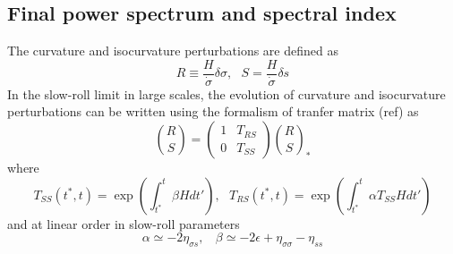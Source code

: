 \documentclass[twocolumn,           %
               showpacs,            %
               preprintnumbers,     %
               aps,                 %
               prl,          	    %
               letterpaper,             %
               superscriptaddress,      %
               nofootinbib,         %
               tightenlines,        %
               floats,floatfix      %
               ,usenatbib,
               ]{revtex4-1}
\begin{document}
\subsection{Final power spectrum and spectral index}
The curvature and isocurvature perturbations are defined as
\begin{equation}\label{RS}
R\equiv\frac{H}{\dot\sigma}\delta \sigma, \ \ \ S=\frac{H}{\dot \sigma}\delta s
\end{equation}
In the slow-roll limit in large scales, the evolution of curvature and isocurvature perturbations can be written using the formalism of tranfer matrix (ref) as
\begin{equation}
\binom{R }{S}=\begin{pmatrix}1 & T_{RS}\\ 0& T_{SS}\end{pmatrix}\binom{R}{S}_*
\end{equation}
where
\begin{subequations}
\begin{equation}
T_{SS}(t^*,t)=\exp\left(\int^t_{t^*}\beta Hdt'\right), \ \ \
\end{equation}
\begin{equation}\label{TRS}
T_{RS}(t^*,t)=\exp\left(\int^t_{t^*}\alpha T_{SS}Hdt'\right)
\end{equation}
\end{subequations}
and at linear order in slow-roll parameters
\begin{equation}
\alpha\simeq -2\eta_{\sigma s}, \ \ \ \ \beta\simeq-2\epsilon+\eta_{\sigma\sigma}-\eta_{ss}
\end{equation}
\end{document}
